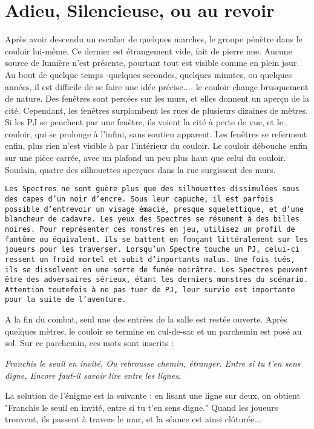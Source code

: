 \documentclass[a4paper, 11pt]{article}
\begin{document}
\section{Adieu, Silencieuse, ou au revoir}
Après avoir descendu un escalier de quelques marches, le groupe pénètre dans le couloir lui-même. Ce dernier est étrangement vide, fait de pierre nue. Aucune source de lumière n'est présente, pourtant tout est visible comme en plein jour. Au bout de quelque temps -quelques secondes, quelques minutes, ou quelques années, il est difficile de se faire une idée précise...- le couloir change brusquement de nature. Des fenêtres sont percées sur les murs, et elles donnent un aperçu de la cité. Cependant, les fenêtres surplombent les rues de plusieurs dizaines de mètres. Si les PJ se penchent par une fenêtre, ils voient la cité à perte de vue, et le couloir, qui se prolonge à l'infini, sans soutien apparent. Les fenêtres se referment enfin, plus rien n'est visible à par l'intérieur du couloir. Le couloir débouche enfin sur une pièce carrée, avec un plafond un peu plus haut que celui du couloir. Soudain, quatre des silhouettes aperçues dans la rue surgissent des murs.
\begin{flushright}
\texttt{Les Spectres ne sont guère plus que des silhouettes dissimulées sous des capes d'un noir d'encre. Sous leur capuche, il est parfois possible d'entrevoir un visage émacié, presque squelettique, et d'une blancheur de cadavre. Les yeux des Spectres se résument à des billes noires. Pour représenter ces monstres en jeu, utilisez un profil de fantôme ou équivalent. Ils se battent en fonçant littéralement sur les joueurs pour les traverser. Lorsqu'un Spectre touche un PJ, celui-ci ressent un froid mortel et subit d'importants malus. Une fois tués, ils se dissolvent en une sorte de fumée noirâtre. Les Spectres peuvent être des adversaires sérieux, étant les derniers monstres du scénario. Attention toutefois à ne pas tuer de PJ, leur survie est importante pour la suite de l'aventure.}
\end{flushright}
A la fin du combat, seul une des entrées de la salle est restée ouverte. Après quelques mètres, le couloir se termine en cul-de-sac et un parchemin est posé au sol. Sur ce parchemin, ces mots sont inscrits :
\begin{center}
\emph{Franchis le seuil en invité,
\newline
Ou rebrousse chemin, étranger.
\newline
Entre si tu t'en sens digne,
\newline
Encore faut-il savoir lire entre les lignes.}
\end{center}
La solution de l'énigme est la suivante : en lisant une ligne sur deux, on obtient "Franchis le seuil en invité, entre si tu t'en sens digne." Quand les joueurs trouvent, ils passent à travers le mur, et la séance est ainsi clôturée...
\end{document}
